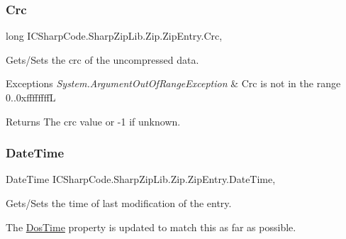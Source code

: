 \subsubsection{\texorpdfstring{Crc}{Crc}}
{\footnotesize\ttfamily long I\+C\+Sharp\+Code.\+Sharp\+Zip\+Lib.\+Zip.\+Zip\+Entry.\+Crc\hspace{0.3cm}{\ttfamily [get]}, {\ttfamily [set]}}



Gets/\+Sets the crc of the uncompressed data. 


\begin{DoxyExceptions}{Exceptions}
{\em System.\+Argument\+Out\+Of\+Range\+Exception} & Crc is not in the range 0..0xffffffffL \\
\hline
\end{DoxyExceptions}
\begin{DoxyReturn}{Returns}
The crc value or -\/1 if unknown. 
\end{DoxyReturn}
\mbox{\label{class_i_c_sharp_code_1_1_sharp_zip_lib_1_1_zip_1_1_zip_entry_a1771dc696c0266c7ed4908246f3e1329}} 
\subsubsection{\texorpdfstring{Date\+Time}{DateTime}}
{\footnotesize\ttfamily Date\+Time I\+C\+Sharp\+Code.\+Sharp\+Zip\+Lib.\+Zip.\+Zip\+Entry.\+Date\+Time\hspace{0.3cm}{\ttfamily [get]}, {\ttfamily [set]}}



Gets/\+Sets the time of last modification of the entry. 

The \hyperlink{class_i_c_sharp_code_1_1_sharp_zip_lib_1_1_zip_1_1_zip_entry_a7109fba91243e2e6f235514a516f55a1}{Dos\+Time} property is updated to match this as far as possible. \mbox{\label{class_i_c_sharp_code_1_1_sharp_zip_lib_1_1_zip_1_1_zip_entry_a7109fba91243e2e6f235514a516f55a1}} 
